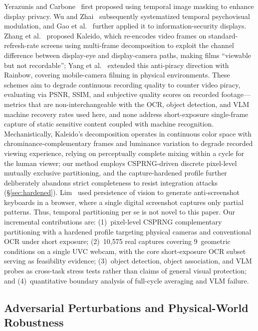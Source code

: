 \documentclass{ieeeaccess}
\begin{document}
Yerazunis and Carbone~\cite{b_yerazunis2001} first proposed using temporal image masking to enhance display privacy. Wu and Zhai~\cite{b_wu2013} subsequently systematized temporal psychovisual modulation, and Gao et al.~\cite{b_gao2014} further applied it to information-security displays. Zhang et al.~\cite{b_kaleido2015} proposed Kaleido, which re-encodes video frames on standard-refresh-rate screens using multi-frame decomposition to exploit the channel difference between display-eye and display-camera paths, making films ``viewable but not recordable''; Yang et al.~\cite{b_rainbow2018} extended this anti-piracy direction with Rainbow, covering mobile-camera filming in physical environments. These schemes aim to degrade continuous recording quality to counter video piracy, evaluating via PSNR, SSIM, and subjective quality scores on recorded footage---metrics that are non-interchangeable with the OCR, object detection, and VLM machine recovery rates used here, and none address short-exposure single-frame capture of static sensitive content coupled with machine recognition. Mechanistically, Kaleido's decomposition operates in continuous color space with chrominance-complementary frames and luminance variation to degrade recorded viewing experience, relying on perceptually complete mixing within a cycle for the human viewer; our method employs CSPRNG-driven discrete pixel-level mutually exclusive partitioning, and the capture-hardened profile further deliberately abandons strict completeness to resist integration attacks (\S\ref{sec:hardened}). Lim~\cite{b_lim2007} used persistence of vision to generate anti-screenshot keyboards in a browser, where a single digital screenshot captures only partial patterns. Thus, temporal partitioning per se is not novel to this paper. Our incremental contributions are: (1)~pixel-level CSPRNG complementary partitioning with a hardened profile targeting physical cameras and conventional OCR under short exposure; (2)~10,575 real captures covering 9~geometric conditions on a single UVC webcam, with the core short-exposure OCR subset serving as feasibility evidence; (3)~object detection, object association, and VLM probes as cross-task stress tests rather than claims of general visual protection; and (4)~quantitative boundary analysis of full-cycle averaging and VLM failure.

\subsection{Adversarial Perturbations and Physical-World Robustness}
\end{document}
